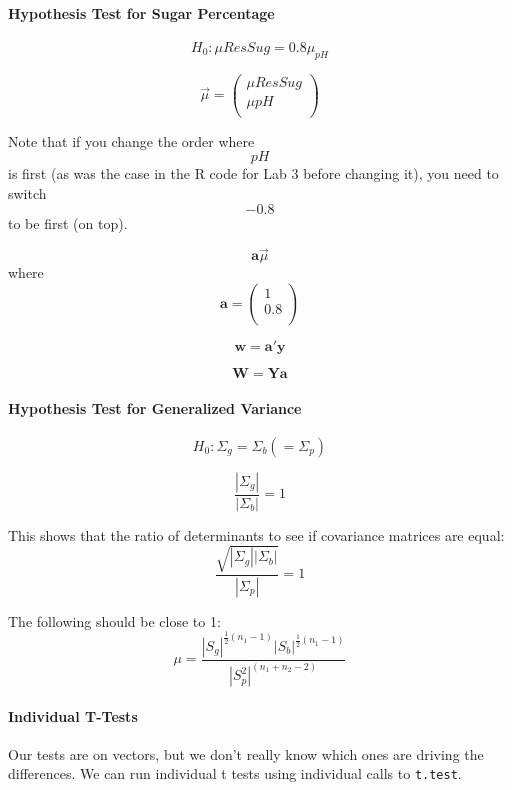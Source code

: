 \documentclass[]{article}
\let\oldparagraph\paragraph
\renewcommand{\paragraph}[1]{\oldparagraph{#1}\mbox{}}
\begin{document}
\hypertarget{hypothesis-test-for-sugar-percentage}{%
\paragraph{Hypothesis Test for Sugar
Percentage}\label{hypothesis-test-for-sugar-percentage}}

\[H_0: \mu{ResSug} = 0.8\mu_{pH}\]

\[\overrightarrow{\mu} = \left(\begin{array}{c} \mu{ResSug} \\ \mu{pH} \\ \end{array} \right)\]

Note that if you change the order where \[pH\] is first (as was the case
in the R code for Lab 3 before changing it), you need to switch \[-0.8\]
to be first (on top).

\[\mathbf{a}\overrightarrow{\mu}\] where
\[ \mathbf{a} = \left( \begin{array}{c} 1 \\ 0.8 \\ \end{array} \right)\]

\[\mathbf{w} = \mathbf{a'y}\]

\[\mathbf{W} = \mathbf{Ya}\]

\hypertarget{hypothesis-test-for-generalized-variance}{%
\paragraph{Hypothesis Test for Generalized
Variance}\label{hypothesis-test-for-generalized-variance}}

\[H_0: \Sigma_g = \Sigma_b (= \Sigma_p)\]

\[\frac{| \Sigma_g |}{| \Sigma_b |} = 1\]

This shows that the ratio of determinants to see if covariance matrices
are equal: \[\frac{ \sqrt{|\Sigma_g||\Sigma_b| }}{|\Sigma_p|} = 1\]

The following should be close to 1:
\[\mu = \frac{|S_g|^{\frac{1}{2}(n_1 - 1)}|S_b|^{\frac{1}{2}(n_1 - 1)}}{|S_p^2|^{(n_1 + n_2 - 2)}}\]

\hypertarget{individual-t-tests}{%
\paragraph{Individual T-Tests}\label{individual-t-tests}}

Our tests are on vectors, but we don't really know which ones are
driving the differences. We can run individual t tests using individual
calls to \texttt{t.test}.
\end{document}
